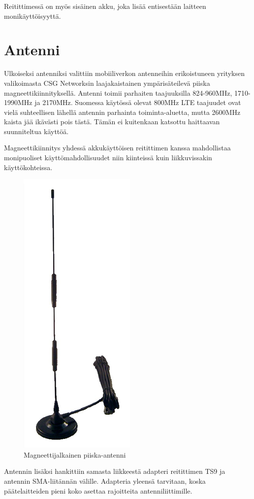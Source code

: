\documentclass[11pt,a4paper,oneside,article,finnish]{memoir}
\begin{document}
Reitittimessä on myös sisäinen akku, joka lisää entisestään laitteen monikäyttöisyyttä.
\section{Antenni}

Ulkoiseksi antenniksi valittiin mobiiliverkon antenneihin erikoistuneen yrityksen valikoimasta CSG Networksin laajakaistainen ympärisäteilevä piiska magneettikiinnityksellä. Antenni toimii parhaiten taajuuksilla 824-960MHz, 1710-1990MHz ja 2170MHz. Suomessa käytössä olevat 800MHz LTE taajuudet ovat vielä suhteellisen lähellä antennin parhainta toiminta-aluetta, mutta 2600MHz kaista jää ikävästi pois tästä. Tämän ei kuitenkaan katsottu haittaavan suunniteltua käyttöä.

Magneettikiinnitys yhdessä akkukäyttöisen reitittimen kanssa mahdollistaa monipuoliset käyttömahdollisuudet niin kiinteissä kuin liikkuvissakin käyttökohteissa.
\begin{figure}[H]
	\centering
	\includegraphics[scale=0.5]{antennapic}
	\caption{Magneettijalkainen piiska-antenni}
	\label{fig:antennapic}
\end{figure}

Antennin lisäksi hankittiin samasta liikkeestä adapteri reitittimen TS9 ja antennin SMA-liitännän välille. Adapteria yleensä tarvitaan, koska päätelaitteiden pieni koko asettaa rajoitteita antenniliittimille.
\end{document}

